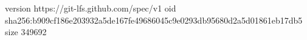version https://git-lfs.github.com/spec/v1
oid sha256:b909cf186e203932a5de167fe49686045c9e0293db95680d2a5d01861eb17db5
size 349692
